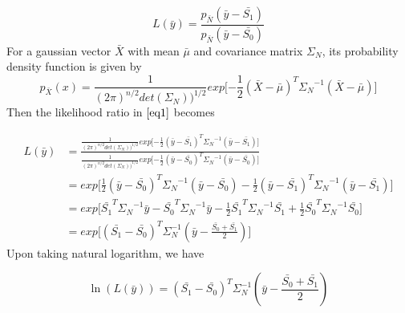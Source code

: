 \documentclass[12pt]{report}
\begin{document}
   \begin{equation}  
\label{eq1}L(\bar{y})=\frac{ p_{\bar{N}}(\bar{y}-\bar{S_1})}{ p_{\bar{N}}(\bar{y}-\bar{S_0})}
\end{equation}
For a gaussian vector $\bar{X}$ with mean $\bar{\mu}$ and covariance matrix $\varSigma_{N}$, its probability density function is given by 
  \[p_{\bar{X}}(x)= {\frac{1}{(2\pi)^{n/2}det(\varSigma_{N}))^{1/2}}}{exp\lbrack-{\frac{1}{2}}{(\bar{X}-\bar{\mu})^T}{{\varSigma_{N}}^{-1}}{(\bar{X}-\bar{\mu})}\rbrack}\]
  Then the likelihood ratio in $\eqref{eq1}$ becomes
  
\begin{align*}L(\bar{y})&=\frac{{\frac{1}{(2\pi)^{n/2}det(\varSigma_{N}))^{1/2}}}{exp\lbrack-{\frac{1}{2}}{(\bar{y}-\bar{S_1})^T}{{\varSigma_{N}}^{-1}}{(\bar{y}-\bar{S_1})}\rbrack}}{{\frac{1}{(2\pi)^{n/2}det(\varSigma_{N}))^{1/2}}}{exp\lbrack-{\frac{1}{2}}{(\bar{y}-\bar{S_0})^T}{{\varSigma_{N}}^{-1}}{(\bar{y}-\bar{S_0})}\rbrack}}\\& =exp{\lbrack{\frac{1}{2}}{(\bar{y}-\bar{S_0})^T}{{\varSigma_{N}}^{-1}}{(\bar{y}-\bar{S_0})}-{\frac{1}{2}}{(\bar{y}-\bar{S_1})^T}{{\varSigma_{N}}^{-1}}{(\bar{y}-\bar{S_1})}\rbrack}\\& =exp{\lbrack{\bar{S_1}^T{\varSigma_{N}}^{-1}{\bar{y}}-\bar{S_0}^T{\varSigma_{N}}^{-1}{\bar{y}}-{\frac{1}{2}}\bar{S_1}^T{\varSigma_{N}}^{-1}{\bar{S_1}}+{\frac{1}{2}}\bar{S_0}^T{\varSigma_{N}}^{-1}{\bar{S_0}}\rbrack}}\\& =exp{\lbrack{(\bar{S_1}-\bar{S_0})^T{\varSigma_{N}^{-1}({\bar{y}-\frac{\bar{S_0}+\bar{S_1}}{2}})}\rbrack}}\end{align*}
\noindent Upon taking natural logarithm, we have

 \[\ln(L(\bar{y}))=(\bar{S_1}-\bar{S_0})^T{\varSigma_{N}^{-1}}({\bar{y}-\frac{\bar{S_0}+\bar{S_1}}{2}})\]
 
\end{document}
